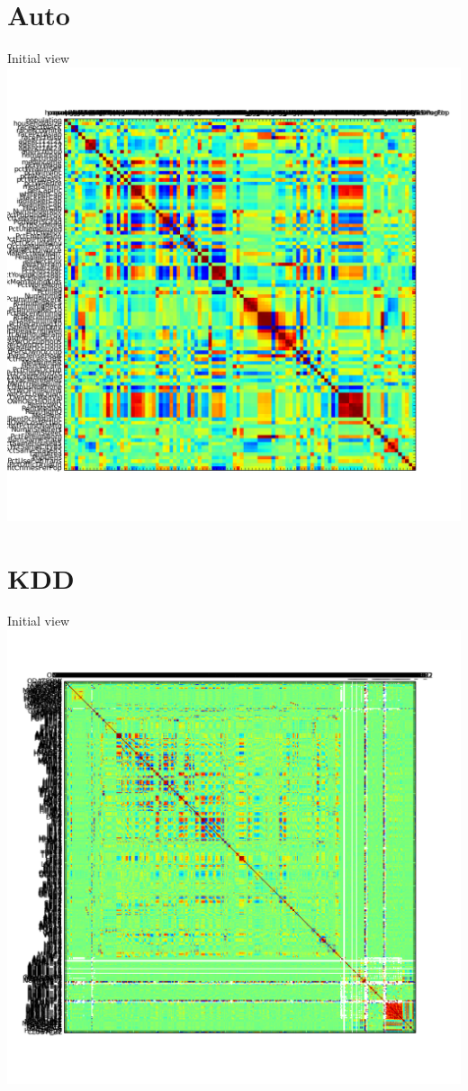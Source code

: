 \documentclass[12pt]{beamer}
\begin{document}
\section{Auto}
\begin{frame}{Initial view}
\includegraphics[height=\textheight,width=\textwidth,keepaspectratio]{plots/communities_orig.png}
\end{frame}

\section{KDD}
\begin{frame}{Initial view}
\includegraphics[height=\textheight,width=\textwidth,keepaspectratio]{plots/kdd_orig.png}
\end{frame}
\end{document}
